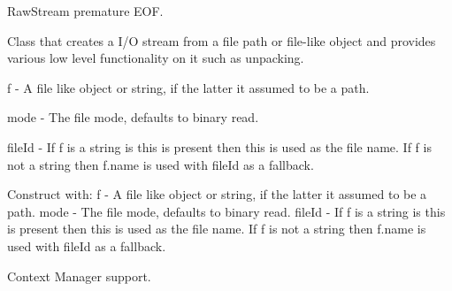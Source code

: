 \documentclass[letterpaper,10pt,english]{sphinxmanual}
\begin{document}

\begin{fulllineitems}
\label{\detokenize{ref/LIS/core/RawStream:TotalDepth.LIS.core.RawStream.ExceptionRawStreamEOF}}
RawStream premature EOF.

\end{fulllineitems}


\begin{fulllineitems}
\label{\detokenize{ref/LIS/core/RawStream:TotalDepth.LIS.core.RawStream.RawStream}}
Class that creates a I/O stream from a file path or file-like object
and provides various low level functionality on it such as unpacking.

f - A file like object or string, if the latter it assumed to be a path.

mode - The file mode, defaults to binary read.

fileId - If f is a string is this is present then this is used as the
file name. If f is not a string then f.name is used with
fileId as a fallback.

\begin{fulllineitems}
\label{\detokenize{ref/LIS/core/RawStream:TotalDepth.LIS.core.RawStream.RawStream.__init__}}
Construct with:
f - A file like object or string, if the latter it assumed to be a path.
mode - The file mode, defaults to binary read.
fileId - If f is a string is this is present then this is used as the
file name. If f is not a string then f.name is used with
fileId as a fallback.

\end{fulllineitems}


\begin{fulllineitems}
\label{\detokenize{ref/LIS/core/RawStream:TotalDepth.LIS.core.RawStream.RawStream.__enter__}}
Context Manager support.


\end{fulllineitems}
\end{fulllineitems}
\end{document}
